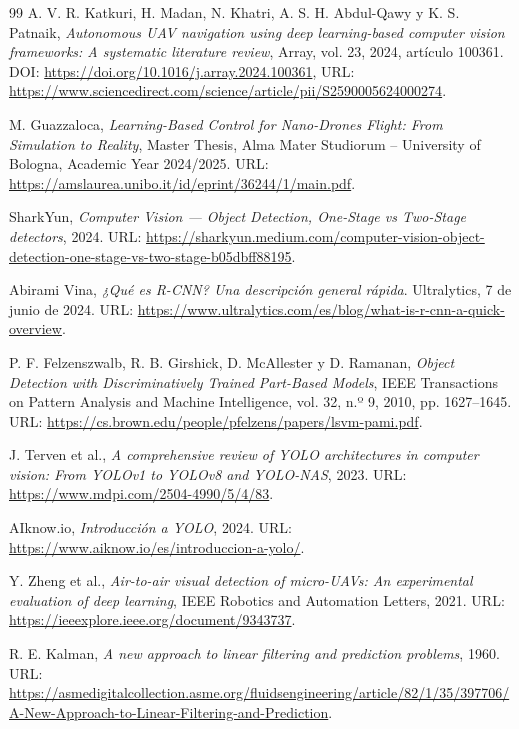 \begin{thebibliography}{99}
 A. V. R. Katkuri, H. Madan, N. Khatri, A. S. H. Abdul-Qawy y K. S. Patnaik, \textit{Autonomous UAV navigation using deep learning-based computer vision frameworks: A systematic literature review}, Array, vol. 23, 2024, artículo 100361. DOI: \url{https://doi.org/10.1016/j.array.2024.100361}, URL: \url{https://www.sciencedirect.com/science/article/pii/S2590005624000274}.

 M. Guazzaloca, \textit{Learning-Based Control for Nano-Drones Flight: From Simulation to Reality}, Master Thesis, Alma Mater Studiorum -- University of Bologna, Academic Year 2024/2025. URL: \url{https://amslaurea.unibo.it/id/eprint/36244/1/main.pdf}.

 SharkYun, \textit{Computer Vision --- Object Detection, One-Stage vs Two-Stage detectors}, 2024. URL: \url{https://sharkyun.medium.com/computer-vision-object-detection-one-stage-vs-two-stage-b05dbff88195}.

 Abirami Vina, \textit{¿Qué es R-CNN? Una descripción general rápida}. Ultralytics, 7 de junio de 2024. URL: \url{https://www.ultralytics.com/es/blog/what-is-r-cnn-a-quick-overview}.

 P. F. Felzenszwalb, R. B. Girshick, D. McAllester y D. Ramanan, \textit{Object Detection with Discriminatively Trained Part-Based Models}, IEEE Transactions on Pattern Analysis and Machine Intelligence, vol. 32, n.º 9, 2010, pp. 1627--1645. URL: \url{https://cs.brown.edu/people/pfelzens/papers/lsvm-pami.pdf}.

 J. Terven et al., \textit{A comprehensive review of YOLO architectures in computer vision: From YOLOv1 to YOLOv8 and YOLO-NAS}, 2023. URL: \url{https://www.mdpi.com/2504-4990/5/4/83}.

\vspace{0.4cm}

 AIknow.io, \textit{Introducción a YOLO}, 2024. URL: \url{https://www.aiknow.io/es/introduccion-a-yolo/}.

 Y. Zheng et al., \textit{Air-to-air visual detection of micro-UAVs: An experimental evaluation of deep learning}, IEEE Robotics and Automation Letters, 2021. URL: \url{https://ieeexplore.ieee.org/document/9343737}.


 R. E. Kalman, \textit{A new approach to linear filtering and prediction problems}, 1960. URL: \url{https://asmedigitalcollection.asme.org/fluidsengineering/article/82/1/35/397706/A-New-Approach-to-Linear-Filtering-and-Prediction}.


\end{thebibliography}
